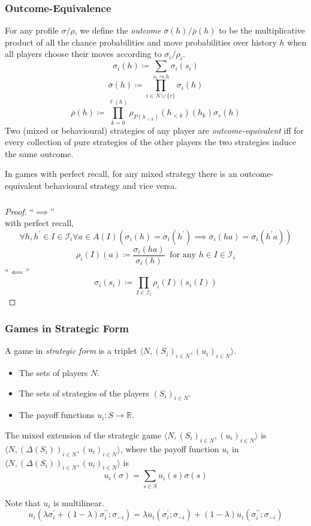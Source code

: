 \documentclass[UTF8,11pt,colorlinks,compress,openany]{beamer}%
\begin{document}
\begin{frame}\frametitle{Outcome-Equivalence}
For any profile $\sigma/\rho$, we define the \emph{outcome} $\overline{\sigma}(h)/\overline{\rho}(h)$ to be the multiplicative product of all the chance probabilities and move probabilities over history $h$ when all players choose their moves according to $\sigma_i/\rho_i$.
\[\sigma_i(h)\coloneqq \sum\limits_{s_i\leadsto h}\sigma_i(s_i)\]
\[\overline{\sigma}(h)\coloneqq \prod\limits_{i\in N\cup\{c\}}\sigma_i(h)\]
\[\overline{\rho}(h)\coloneqq \prod\limits_{k=0}^{\ell(h)}\rho_{P(h_{<k})}(h_{<k})(h_k)\sigma_c(h)\]
Two (mixed or behavioural) strategies of any player are \emph{outcome-equivalent} iff for every collection of pure strategies of the other players the two strategies induce the same outcome.
\begin{theorem}
	In games with perfect recall, for any mixed strategy there is an outcome-equivalent behavioural strategy and vice versa.
\end{theorem}
\end{frame}

\begin{frame}\frametitle{}
\begin{proof}
	``$\implies$''\\
	with perfect recall,
	\[\forall h,h^\prime\in I\in\mathcal{I}_i\forall a\in A(I)\left(\sigma_i(h)=\sigma_i(h^\prime)\implies\sigma_i(ha)=\sigma_i(h^\prime a)\right)\]
	\[\rho_i(I)(a)\coloneqq \dfrac{\sigma_i(ha)}{\sigma_i(h)}\;\;\text{for any $h\in I\in\mathcal{I}_i$}\]
	``$\impliedby$''
	\[\sigma_i(s_i)\coloneqq \prod\limits_{I\in\mathcal{I}_i}\rho_i(I)(s_i(I))\]
\end{proof}
\end{frame}

\begin{frame}\frametitle{Games in Strategic Form}
\begin{definition}
	A game in \emph{strategic form} is a triplet $\langle N,(S_i)_{i\in N},(u_i)_{i\in N}\rangle$.
	\begin{itemize}
		\item The sets of players $N$.
		\item The sets of strategies of the players $(S_i)_{i\in N}$.
		\item The payoff functions $u_i: S\to\mathbb R$.
	\end{itemize}
\end{definition}
\begin{definition}
	The mixed extension of the strategic game $\langle N,(S_i)_{i\in N},(u_i)_{i\in N}\rangle$ is $\langle N,(\Delta(S_i))_{i\in N},(u_i)_{i\in N}\rangle$, where the payoff function $u_i$ in $\langle N,(\Delta(S_i))_{i\in N},(u_i)_{i\in N}\rangle$ is \[u_i(\sigma)=\sum\limits_{s\in S}u_i(s)\sigma(s)\]
\end{definition}
Note that $u_i$ is multilinear.
\[u_i(\lambda\sigma_i^\prime+(1-\lambda)\sigma_i^{\prime\prime};\sigma_{-i})=\lambda u_i(\sigma_i^\prime;\sigma_{-i})+(1-\lambda)u_i(\sigma_i^{\prime\prime};\sigma_{-i})\]
\end{frame}
\end{document}
